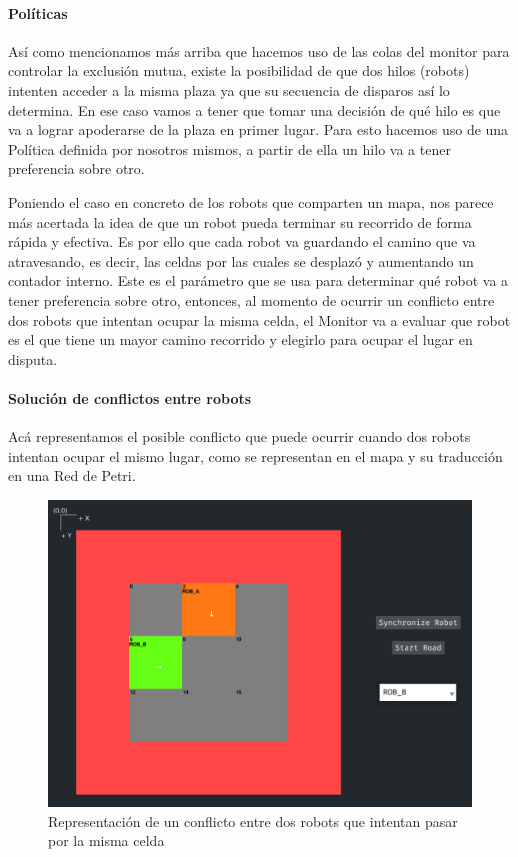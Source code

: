 \paragraph{Políticas} \mbox{} \vspace{5pt}

Así como mencionamos más arriba que hacemos uso de las colas del monitor para controlar la exclusión mutua, existe la posibilidad de que dos hilos (robots) intenten acceder a la misma plaza ya que su secuencia de disparos así lo determina. En ese caso vamos a tener que tomar una decisión de qué hilo es que va a lograr apoderarse de la plaza en primer lugar. Para esto hacemos uso de una Política definida por nosotros mismos, a partir de ella un hilo va a tener preferencia sobre otro.

Poniendo el caso en concreto de los robots que comparten un mapa, nos parece más acertada la idea de que un robot pueda terminar su recorrido de forma rápida y efectiva. Es por ello que cada robot va guardando el camino que va atravesando, es decir, las celdas por las cuales se desplazó y aumentando un contador interno. Este es el parámetro que se usa para determinar qué robot va a tener preferencia sobre otro, entonces, al momento de ocurrir un conflicto entre dos robots que intentan ocupar la misma celda, el Monitor va a evaluar que robot es el que tiene un mayor camino recorrido y elegirlo para ocupar el lugar en disputa.

\paragraph{Solución de conflictos entre robots} \mbox{} \vspace{5pt}

Acá representamos el posible conflicto que puede ocurrir cuando dos robots intentan ocupar el mismo lugar, como se representan en el mapa y su traducción en una Red de Petri.

\begin{figure}[H]
    \centering
    \includegraphics[width=0.7\linewidth]{images/conflicto_map.png}
    \caption{Representación de un conflicto entre dos robots que intentan pasar por la misma celda}
    \label{fig:conflicto_map}
\end{figure}

